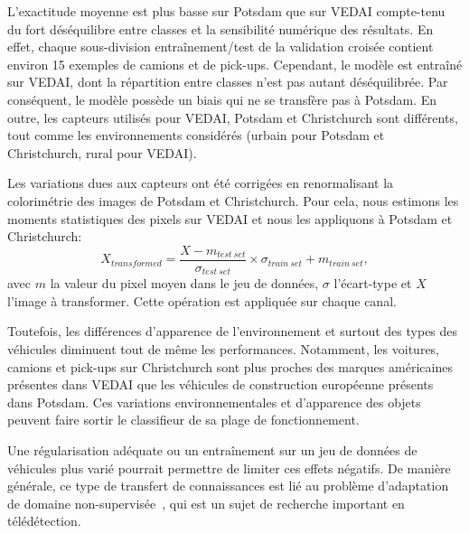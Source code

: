 L'exactitude moyenne est plus basse sur Potsdam que sur \gls{VEDAI} compte-tenu du fort déséquilibre entre classes et la sensibilité numérique des résultats. En effet, chaque sous-division entraînement/test de la validation croisée contient environ 15 exemples de camions et de pick-ups. Cependant, le modèle est entraîné sur \gls{VEDAI}, dont la répartition entre classes n'est pas autant déséquilibrée. Par conséquent, le modèle possède un biais qui ne se transfère pas à Potsdam. En outre, les capteurs utilisés pour \gls{VEDAI}, Potsdam et Christchurch sont différents, tout comme les environnements considérés (urbain pour Potsdam et Christchurch, rural pour \gls{VEDAI}).

Les variations dues aux capteurs ont été corrigées en renormalisant la colorimétrie des images de Potsdam et Christchurch. Pour cela, nous estimons les moments statistiques des pixels sur \gls{VEDAI} et nous les appliquons à Potsdam et Christchurch:
\begin{equation}
X_{transformed} = \frac{X - m_{test~set}}{\sigma_{test~set}} \times \sigma_{train~set} + m_{train~set},
\end{equation}
avec $m$ la valeur du pixel moyen dans le jeu de données, $\sigma$ l'écart-type et $X$ l'image à transformer. Cette opération est appliquée sur chaque canal.

Toutefois, les différences d'apparence de l'environnement et surtout des types des véhicules diminuent tout de même les performances. Notamment, les voitures, camions et pick-ups sur Christchurch sont plus proches des marques américaines présentes dans \gls{VEDAI} que les véhicules de construction européenne présents dans Potsdam. Ces variations environnementales et d'apparence des objets peuvent faire sortir le classifieur de sa plage de fonctionnement.

Une régularisation adéquate ou un entraînement sur un jeu de données de véhicules plus varié pourrait permettre de limiter ces effets négatifs. De manière générale, ce type de transfert de connaissances est lié au problème d'adaptation de domaine non-supervisée~\cite{tuia_domain_2016,courty_optimal_2016}, qui est un sujet de recherche important en télédétection.

